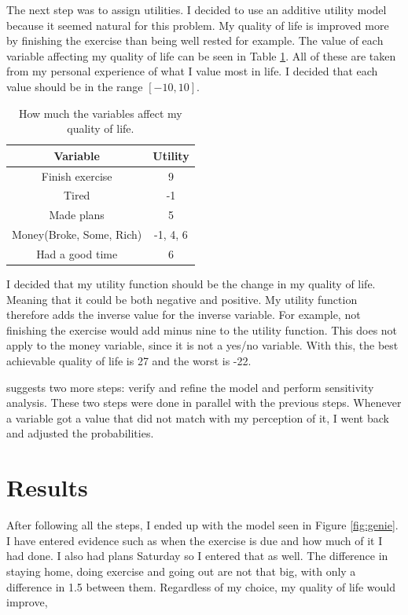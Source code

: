 \documentclass{article}
\begin{document}
    The next step was to assign utilities. I decided to use an additive utility
    model because it seemed natural for this problem. My quality of life is
    improved more by finishing the exercise than being well rested for example.
    The value of each variable affecting my quality of life can be seen in
    Table \ref{tab:utility}. All of these are taken from my personal experience
    of what I value most in life. I decided that each value should be in the
    range $\left[ -10, 10 \right]$.

    \begin{table}[ht]
        \centering
        \begin{tabular}{| c | c |}\hline
            Variable &  Utility\\\hline
            Finish exercise & 9\\ \hline
            Tired & -1\\ \hline
            Made plans & 5\\ \hline
            Money(Broke, Some, Rich) & -1, 4, 6\\\hline
            Had a good time & 6\\\hline
        \end{tabular}
        \caption{How much the variables affect my quality of life.}
        \label{tab:utility}
    \end{table}
    
    I decided that my utility function should be the change in my quality of
    life. Meaning that it could be both negative and positive. My utility
    function therefore adds the inverse value for the inverse variable. For
    example, not finishing the exercise would add minus nine to the utility
    function. This does not apply to the money variable, since it is not a
    yes/no variable. With this, the best achievable quality of life is 27 and
    the worst is -22.

     suggests two more steps: verify and refine the
    model and perform sensitivity analysis. These two steps were done in
    parallel with the previous steps. Whenever a variable got a value that
    did not match with my perception of it, I went back and adjusted the
    probabilities.



\section*{Results}
    After following all the steps, I ended up with the model seen in Figure
    \ref{fig:genie}. I have entered evidence such as when the exercise is due
    and how much of it I had done. I also had plans Saturday so I entered that
    as well. The difference in staying home, doing exercise and going out are
    not that big, with only a difference in 1.5 between them. Regardless of my
    choice, my quality of life would improve,
\end{document}
